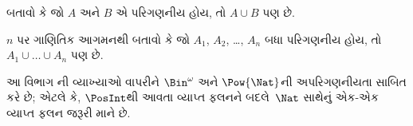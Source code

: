\begin{prob}
બતાવો કે જો $A$ અને $B$ એ પરિગણનીય હોય, તો $A \cup B$ પણ છે.
\end{prob}

\begin{prob}
$n$ પર ગાણિતિક આગમનથી બતાવો કે જો $A_1$, $A_2$, \dots, $A_n$
બધા પરિગણનીય હોય, તો $A_1 \cup \dots \cup A_n$ પણ છે.
\end{prob}
\endgroup

\begingroup
\makeatletter{}\makeatother


\label{guunit:OLP-0039}


\begin{editorial}
  આ વિભાગ ની વ્યાખ્યાઓ વાપરીને
  $\Bin^\omega$ અને $\Pow{\Nat}$ની અપરિગણનીયતા સાબિત કરે છે;
  એટલે કે, $\PosInt$થી આવતા વ્યાપ્ત ફલનને બદલે~$\Nat$ સાથેનું
  એક-એક વ્યાપ્ત ફલન જરૂરી માને છે.
\end{editorial}


